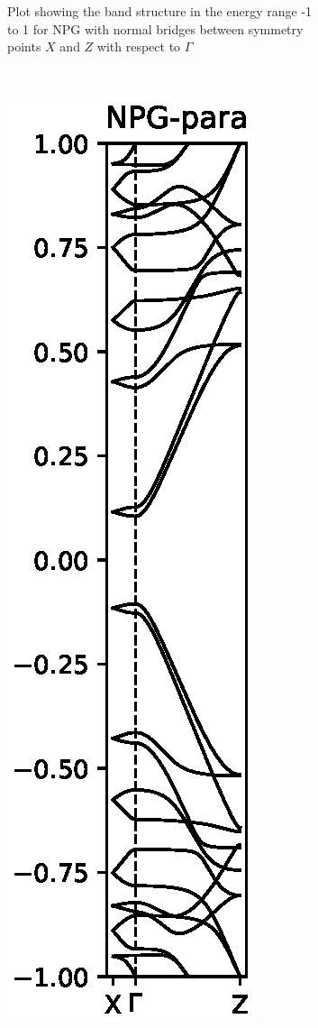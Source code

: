 \begin{figure}
\begin{subfigure}[b]{0.3\textwidth}
                \caption{Plot showing the band structure in the energy range -1 to 1 for NPG with normal bridges between symmetry points \(X\) and \(Z\) with respect to \(\Gamma\)}
        \label{Fabbs}
    \end{subfigure}
    ~ %
    \begin{subfigure}[b]{0.3\textwidth}
        \includegraphics[width=\textwidth]{Figures/paraNPGBS.eps}

\end{subfigure}
\end{figure}
